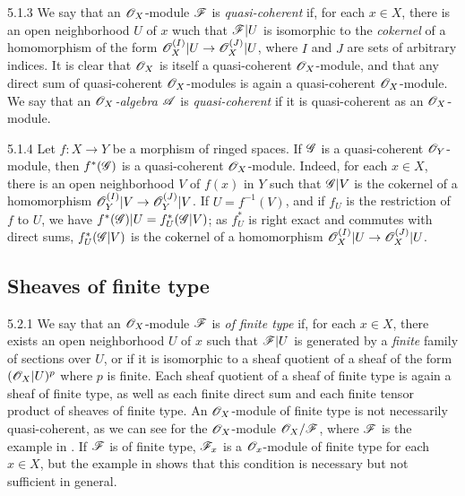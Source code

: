 \begin{env}{5.1.3}
\label{env-0.5.1.3}
We say that an $\mathscr{O}_X$-module $\mathscr{F}$ is \emph{quasi-coherent} if, for each $x\in X$, there
is an open neighborhood $U$ of $x$ wuch that $\mathscr{F}|U$ is isomorphic to the \emph{cokernel}
of a homomorphism of the form $\mathscr{O}_X^{(I)}|U\to\mathscr{O}_X^{(J)}|U$, where $I$ and $J$ are sets of
arbitrary indices. It is clear that $\mathscr{O}_X$ is itself a quasi-coherent $\mathscr{O}_X$-module, and
that any direct sum of quasi-coherent $\mathscr{O}_X$-modules is again a quasi-coherent
$\mathscr{O}_X$-module. We say that an \emph{$\mathscr{O}_X$-algebra $\mathscr{A}$} is \emph{quasi-coherent} if
it is quasi-coherent as an $\mathscr{O}_X$-module.
\end{env}

\begin{env}{5.1.4}
\label{env-0.5.1.4}
Let $f:X\to Y$ be a morphism of ringed spaces. If $\mathscr{G}$ is a quasi-coherent
$\mathscr{O}_Y$-module, then $f^*(\mathscr{G})$ is a quasi-coherent $\mathscr{O}_X$-module. Indeed, for each
$x\in X$, there is an open neighborhood $V$ of $f(x)$ in $Y$ such that $\mathscr{G}|V$ is the
cokernel of a homomorphism $\mathscr{O}_Y^{(I)}|V\to\mathscr{O}_Y^{(J)}|V$. If $U=f^{-1}(V)$, and if $f_U$ is
the restriction of $f$ to $U$, we have $f^*(\mathscr{G})|U=f_U^*(\mathscr{G}|V)$; as $f_U^*$ is right
exact and commutes with direct sums, $f_U^*(\mathscr{G}|V)$ is the cokernel of a homomorphism
$\mathscr{O}_X^{(I)}|U\to\mathscr{O}_X^{(J)}|U$.
\end{env}

\subsection{Sheaves of finite type}
\label{0-prelim-5.2}

\begin{env}{5.2.1}
\label{env-0.5.2.1}
We say that an $\mathscr{O}_X$-module $\mathscr{F}$ is \emph{of finite type} if, for each $x\in X$, there
exists an open neighborhood $U$ of $x$ such that $\mathscr{F}|U$ is generated by a \emph{finite}
family of sections over $U$, or if it is isomorphic to a sheaf quotient of a sheaf of the
form $(\mathscr{O}_X|U)^p$ where $p$ is finite. Each sheaf quotient of a sheaf of finite type is
again a sheaf of finite type, as well as each finite direct sum and each finite tensor
product of sheaves of finite type. An $\mathscr{O}_X$-module of finite type is not necessarily
quasi-coherent, as we can see for the $\mathscr{O}_X$-module $\mathscr{O}_X/\mathscr{F}$, where $\mathscr{F}$ is the
example in . If $\mathscr{F}$ is of finite type, $\mathscr{F}_x$ is a $\mathscr{O}_x$-module
of finite type for each $x\in X$, but the example in  shows that this
condition is necessary but not sufficient in general.
\end{env}

